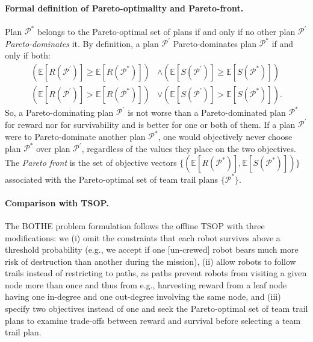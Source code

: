 \documentclass[fleqn,10pt,lineno]{wlpeerj}
\begin{document}
\paragraph{Formal definition of Pareto-optimality and Pareto-front.}
Plan $\mathcal{P}^*$ belongs to the Pareto-optimal set of plans if and only if no other plan $\mathcal{P}^\prime$ \emph{Pareto-dominates} it. By definition, a plan $\mathcal{P}^\prime$ Pareto-dominates plan $\mathcal{P}^*$ if and only if both:
\begin{align}
	\left (\mathbb{E}[R(\mathcal{P}^\prime)] \geq \mathbb{E}[R(\mathcal{P}^*)]  \right) & \wedge \left( \mathbb{E}[S(\mathcal{P}^\prime)] \geq \mathbb{E}[S(\mathcal{P}^*)] \right) \\
	\left( \mathbb{E}[R(\mathcal{P}^\prime)] > \mathbb{E}[R(\mathcal{P}^*)] \right) & \vee \left( \mathbb{E}[S(\mathcal{P}^\prime)] > \mathbb{E}[S(\mathcal{P}^*)] \right).
\end{align}
So, a Pareto-dominating plan $\mathcal{P}^\prime$ is not worse than a Pareto-dominated plan $\mathcal{P}^*$ for reward nor for survivability and is better for one or both of them.
If a plan $\mathcal{P}^\prime$ were to Pareto-dominate another plan $\mathcal{P}^*$, one would objectively never choose plan $\mathcal{P}^*$ over plan $\mathcal{P}^\prime$, regardless of the values they place on the two objectives. The \emph{Pareto front} is the set of objective vectors $\{(\mathbb{E}[R(\mathcal{P}^*)], \mathbb{E}[S(\mathcal{P}^*)])\}$ associated with the Pareto-optimal set of team trail plans $\{\mathcal{P}^*\}$.  

\paragraph{Comparison with TSOP.}
The BOTHE problem formulation follows the offline TSOP \cite{jorgensen2018team} with three modifications: we 
(i) omit the constraints that each robot survives above a threshold probability (e.g., we accept if one [un-crewed] robot bears much more risk of destruction than another during the mission),
(ii) allow robots to follow trails instead of restricting to paths, as paths prevent robots from visiting a given node more than once and thus from e.g., harvesting reward from a leaf node having one in-degree and one out-degree involving the same node, 
and
(iii) specify two objectives instead of one and seek the Pareto-optimal set of team trail plans to examine trade-offs between reward and survival before selecting a team trail plan.
\end{document}
